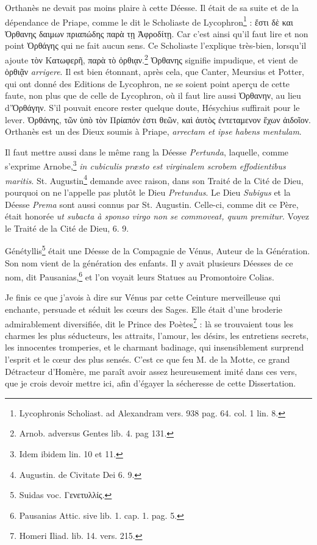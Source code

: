 \documentclass[a4paper, 11pt, oneside, polutonikogreek, french]{article}
\begin{document}
Orthanès ne devait pas moins plaire à cette Déesse. Il était de sa suite et de la dépendance de Priape, comme le dit le Scholiaste de Lycophron\footnote{Lycophronis Scholiast. ad Alexandram vers. 938 pag. 64. col. 1 lin. 8.} : ἔστι δὲ και Ὀρθανης δαιμων πριαπώδης παρὰ τῃ Ἀφροδίτῃ. Car c'est ainsi qu'il faut lire et non point Ὀρθάγης qui ne fait aucun sens. Ce Scholiaste l'explique très-bien, lorsqu'il ajoute τὸν Κατωφερῆ, παρὰ τὸ ὀρθιᾳν.\footnote{Arnob. adversus Gentes lib. 4. pag 131.} Ὀρθανης signifie impudique, et vient de ὁρθιᾷν \emph{arrigere}. Il est bien étonnant, après cela, que Canter, Meursius et Potter, qui ont donné des Editions de Lycophron, ne se soient point aperçu de cette faute, non plus que de celle de Lycophron, où il faut lire aussi Ὀρθανην, au lieu d'Ὀρθάγην. S'il pouvait encore rester quelque doute, Hésychius suffirait pour le lever. Ὀρθάνης, τῶν ὑπὸ τὸν Πρίαπόν ἐστι θεῶν, καὶ ἀυτὸς ἐντεταμενον ἔχων ἀιδοῖον. Orthanès est un des Dieux soumis à Priape, \emph{arrectam et ipse habens mentulam}.

Il faut mettre aussi dans le même rang la Déesse \emph{Pertunda}, laquelle, comme s'exprime Arnobe,\footnote{Idem ibidem lin. 10 et 11.} \emph{in cubiculis præsto est virginalem scrobem effodientibus maritis}. St. Augustin\footnote{Augustin. de Civitate Dei 6. 9.} demande avec raison, dans son Traité de la Cité de Dieu, pourquoi on ne l'appelle pas plutôt le Dieu \emph{Pretundus}. Le Dieu \emph{Subigus} et la Déesse \emph{Prema} sont aussi connus par St. Augustin. Celle-ci, comme dit ce Père, était honorée \emph{ut subacta à sponso virgo non se commoveat, quum premitur}. Voyez le Traité de la Cité de Dieu, 6. 9.

Génétyllis\footnote{Suidas voc. Γενετυλλίς.} était une Déesse de la Compagnie de Vénus, Auteur de la Génération. Son nom vient de la génération des enfants. Il y avait plusieurs Déesses de ce nom, dit Pausanias,\footnote{Pausanias Attic. sive lib. 1. cap. 1. pag. 5.} et l'on voyait leurs Statues au Promontoire Colias.

Je finis ce que j'avois à dire sur Vénus par cette Ceinture merveilleuse qui enchante, persuade et séduit les cœurs des Sages. Elle était d'une broderie admirablement diversifiée, dit le Prince des Poètes\footnote{Homeri Iliad. lib. 14. vers. 215.} : là se trouvaient tous les charmes les plus séducteurs, les attraits, l'amour, les désirs, les entretiens secrets, les innocentes tromperies, et le charmant badinage, qui insensiblement surprend l'esprit et le cœur des plus sensés. C'est ce que feu M. de la Motte, ce grand Détracteur d'Homère, me paraît avoir assez heureusement imité dans ces vers, que je crois devoir mettre ici, afin d'égayer la sécheresse de cette Dissertation.
\end{document}
